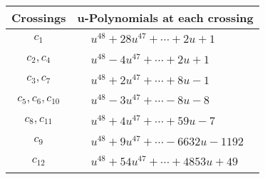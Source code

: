 \documentclass[1p]{elsarticle_modified}
\theoremstyle{definition}
\begin{document}
\begin{tabular}{m{50pt}|m{274pt}}
Crossings & \hspace{64pt}u-Polynomials at each crossing \\
\hline $$\begin{aligned}c_{1}\end{aligned}$$&$\begin{aligned}
&u^{48}+28 u^{47}+\cdots+2 u+1
\end{aligned}$\\
\hline $$\begin{aligned}c_{2},c_{4}\end{aligned}$$&$\begin{aligned}
&u^{48}-4 u^{47}+\cdots+2 u+1
\end{aligned}$\\
\hline $$\begin{aligned}c_{3},c_{7}\end{aligned}$$&$\begin{aligned}
&u^{48}+2 u^{47}+\cdots+8 u-1
\end{aligned}$\\
\hline $$\begin{aligned}c_{5},c_{6},c_{10}\end{aligned}$$&$\begin{aligned}
&u^{48}-3 u^{47}+\cdots-8 u-8
\end{aligned}$\\
\hline $$\begin{aligned}c_{8},c_{11}\end{aligned}$$&$\begin{aligned}
&u^{48}+4 u^{47}+\cdots+59 u-7
\end{aligned}$\\
\hline $$\begin{aligned}c_{9}\end{aligned}$$&$\begin{aligned}
&u^{48}+9 u^{47}+\cdots-6632 u-1192
\end{aligned}$\\
\hline $$\begin{aligned}c_{12}\end{aligned}$$&$\begin{aligned}
&u^{48}+54 u^{47}+\cdots+4853 u+49
\end{aligned}$\\
\hline
\end{tabular}\\~\\
\newpage\renewcommand{\arraystretch}{1}
\end{document}
